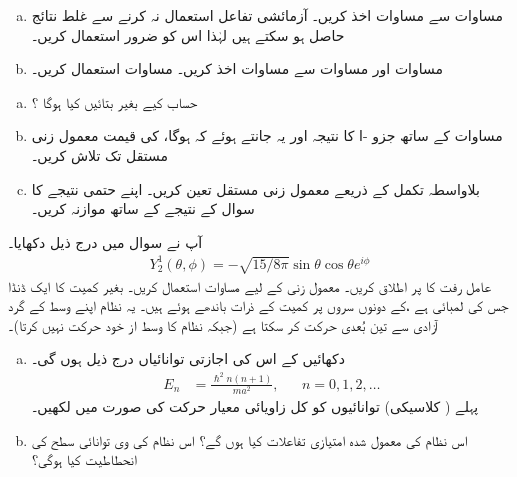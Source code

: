 \begin{enumerate}[a.]
\item
مساوات  سے مساوات   اخذ کریں۔  آزمائشی تفاعل  استعمال نہ کرنے سے غلط نتائج حاصل ہو سکتے ہیں لہٰذا اس کو ضرور استعمال کریں۔ 
\item
مساوات  اور مساوات   سے مساوات    اخذ کریں۔   مساوات    استعمال کریں۔ 
\end{enumerate}
\begin{enumerate}[a.]
\item
حساب کیے بغیر بتائیں  کیا ہوگا ؟
\item
مساوات   کے ساتھ جزو -ا  کا نتیجہ اور یہ جانتے ہوئے کہ  ہوگا،   کی  قیمت معمول زنی مستقل    تک تلاش کریں۔ 
\item
بلاواسطہ تکمل کے ذریعے معمول زنی مستقل  تعین کریں۔ اپنے حتمی نتیجے کا سوال  کے نتیجے کے ساتھ موازنہ کریں۔ 
\end{enumerate} 
آپ نے سوال   میں درج ذیل دکھایا۔ 
\begin{align*} 
Y_2^1 (\theta , \phi) = - \sqrt{15/8 \pi} \sin \theta \cos \theta e^{i \phi}
\end{align*}
عامل رفت کا  پر اطلاق کریں۔ معمول زنی کے لیے مساوات   استعمال کریں۔ 
بغیر کمیت کا ایک ڈنڈا جس کی لمبائی  ہے ،کے دونوں سروں پر کمیت   کے ذرات باندھے ہوئے ہیں۔  یہ  نظام اپنے وسط کے گرد آزادی سے تین بُعدی حرکت کر سکتا ہے (جبکہ نظام کا وسط از  خود حرکت نہیں کرتا)۔ 
\begin{enumerate}[a.]
\item
دکھائیں کے اس   کی اجازتی توانائیاں درج ذیل ہوں گی۔ 
\begin{align*}
E_n& = \frac{\hslash^2 n (n + 1)}{m a^2} ,&& n=0,1,2,\dotsc 
\end{align*}
  پہلے ( کلاسیکی) توانائیوں کو کل زاویائی معیار حرکت کی صورت میں لکھیں۔ 
\item
اس نظام کی معمول شدہ امتیازی تفاعلات کیا ہوں گے؟ اس نظام کی  وی توانائی سطح کی انحطاطیت کیا ہوگی؟ 
\end{enumerate}

